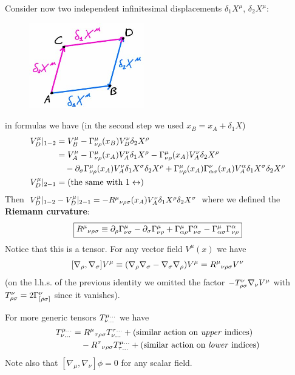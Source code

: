 \documentclass[../main/main.tex]{subfiles}
\begin{document}
Consider now two independent infinitesimal displacements $\delta_1X^\mu$, $\delta_2X^\mu$:
%
\begin{figure}[H]
\centering
\includegraphics[width=5cm]{../img/curv-2-infinit-displ.jpg}
\end{figure}
in formulas we have (in the second step we used $x_B=x_A+\delta_1X$)
\begin{align*}
V_D^\mu\vert_{1-2}
&=V_B^\mu-{\Gamma}^{\mu}_{\nu \rho}(x_B)V_B^\nu\delta_2X^\rho\\
&=V_A^\mu-{\Gamma}^{\mu}_{\nu \rho}(x_A)V_A^\nu\delta_1X^\rho-{\Gamma}^{\mu}_{\nu \rho}(x_A)V_A^\nu\delta_2X^\rho\\
&\quad-\partial_\sigma{\Gamma}^{\mu}_{\nu \rho}(x_A)V_A^\nu\delta_1X^\sigma\delta_2X^\rho+{\Gamma}^{\mu}_{\nu \rho}(x_A){\Gamma}^{\nu}_{\alpha \sigma}(x_A)V_A^\alpha\delta_1X^\sigma\delta_2X^\rho\\
V_D^\mu\vert_{2-1}&=(\text{the same with }1\leftrightarrow)
\end{align*}
Then $V_D^\mu\vert_{1-2}-V_D^\mu\vert_{2-1}=-{{R}^{\mu}}_{\nu \rho \sigma}(x_A)V_A^\nu\delta_1X^\rho\delta_2X^\sigma$ where we defined the \textbf{Riemann curvature}:
\begin{equation}\label{eqn:Riemann-curvature}\boxed{
{{R}^{\mu}}_{\nu \rho \sigma}\equiv\partial_\rho{\Gamma}^{\mu}_{\nu \sigma}-\partial_\sigma{\Gamma}^{\mu}_{\nu \rho}+{\Gamma}^{\mu}_{\alpha \rho}{\Gamma}^{\alpha}_{\nu \sigma}-{\Gamma}^{\mu}_{\alpha \sigma}{\Gamma}^{\alpha}_{\nu \rho}
}\end{equation}
Notice that this is a tensor. For any vector field $V^\mu(x)$ we have
\[[\nabla_\rho,\nabla_\sigma]V^\mu\equiv(\nabla_\rho\nabla_\sigma-\nabla_\sigma\nabla_\rho)V^\mu={{R}^{\mu}}_{\nu \rho \sigma} V^\nu\]
(on the l.h.s. of the previous identity we omitted the factor $-{T}^{\nu}_{\rho\sigma}\nabla_\nu V^\mu$ with ${T}^{\nu}_{\rho\sigma}=2\Gamma^\nu_{[\rho\sigma]}$ since it vanishes). 

For more generic tensors ${T}^{\mu\dots}_{\nu\dots}$ we have
\begin{align*}
[\nabla_\rho,\nabla_\sigma]\tens T{\mu\dots}{\nu\dots}
&=\curv\mu\tau\rho\sigma \tens T{\tau\dots}{\nu\dots}+(\text{similar action on \emph{upper} indices})\\
&\quad-\curv\tau\nu\rho\sigma \tens T{\mu\dots}{\tau\dots}+(\text{similar action on \emph{lower} indices})
\end{align*}
Note also that $[\nabla_\mu,\nabla_\nu]\phi=0$ for any scalar field. 
\end{document}
